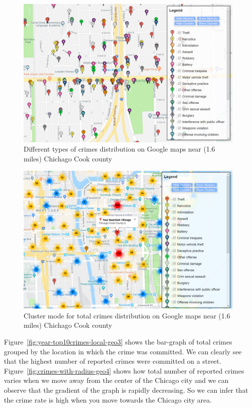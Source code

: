 \begin{figure}[htb]
	\centering\includegraphics[width=\columnwidth]{images/geo1.jpg}
	\caption{Different types of crimes distribution on Google
        maps near (1.6 miles) Chichago Cook
        county}\label{fig:time-totalCrime-geo1}
\end{figure}

\begin{figure}[htb]
	\centering\includegraphics[width=\columnwidth]{images/geo2.jpg}
	\caption{Cluster mode for total crimes distribution on Google
        maps near (1.6 miles) Chichago Cook
        county}\label{fig:time-top10crimes-local-geo2}
\end{figure}

Figure~\ref{fig:year-top10crimes-local-geo3} shows the bar-graph of
total crimes grouped by the location in which the crime was
committed. We can clearly see that the highest number of reported
crimes were committed on a
street. Figure~\ref{fig:crimes-with-radius-geo4} shows how total
number of reported crimes varies when we move away from the center of
the Chicago city and we can observe that the gradient of the graph is
rapidly decreasing. So we can infer that the crime rate is high when
you move towards the Chicago city area.

